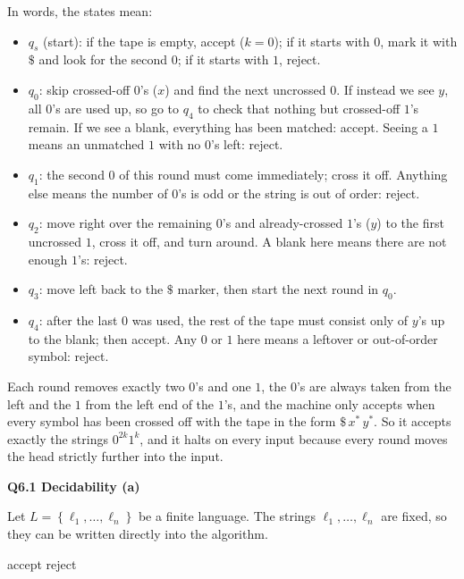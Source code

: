\documentclass[11pt]{article}
\newcommand{\set}[1]{\left\{#1\right\}}
\newcommand{\qpage}[1]{\clearpage\noindent\textbf{\large #1}\par\medskip}
\begin{document}
In words, the states mean:
\begin{itemize}
  \item $q_s$ (start): if the tape is empty, accept ($k = 0$); if it starts with $0$, mark it with $\$$ and look for the second $0$; if it starts with $1$, reject.
  \item $q_0$: skip crossed-off $0$'s ($x$) and find the next uncrossed $0$. If instead we see $y$, all $0$'s are used up, so go to $q_4$ to check that nothing but crossed-off $1$'s remain. If we see a blank, everything has been matched: accept. Seeing a $1$ means an unmatched $1$ with no $0$'s left: reject.
  \item $q_1$: the second $0$ of this round must come immediately; cross it off. Anything else means the number of $0$'s is odd or the string is out of order: reject.
  \item $q_2$: move right over the remaining $0$'s and already-crossed $1$'s ($y$) to the first uncrossed $1$, cross it off, and turn around. A blank here means there are not enough $1$'s: reject.
  \item $q_3$: move left back to the $\$$ marker, then start the next round in $q_0$.
  \item $q_4$: after the last $0$ was used, the rest of the tape must consist only of $y$'s up to the blank; then accept. Any $0$ or $1$ here means a leftover or out-of-order symbol: reject.
\end{itemize}
Each round removes exactly two $0$'s and one $1$, the $0$'s are always taken from the left and the $1$ from the left end of the $1$'s, and the machine only accepts when every symbol has been crossed off with the tape in the form $\$\,x^{*}\,y^{*}$.
So it accepts exactly the strings $0^{2k}1^k$, and it halts on every input because every round moves the head strictly further into the input.

\qpage{Q6.1 Decidability (a)}

Let $L = \set{\ell_1, \ldots, \ell_n}$ be a finite language.
The strings $\ell_1, \ldots, \ell_n$ are fixed, so they can be written directly into the algorithm.

\begin{algorithmic}[1]
       
        \State \Return accept
      \EndIf
    \EndFor
    \State \Return reject
  \EndFunction
\end{algorithmic}
\end{document}
